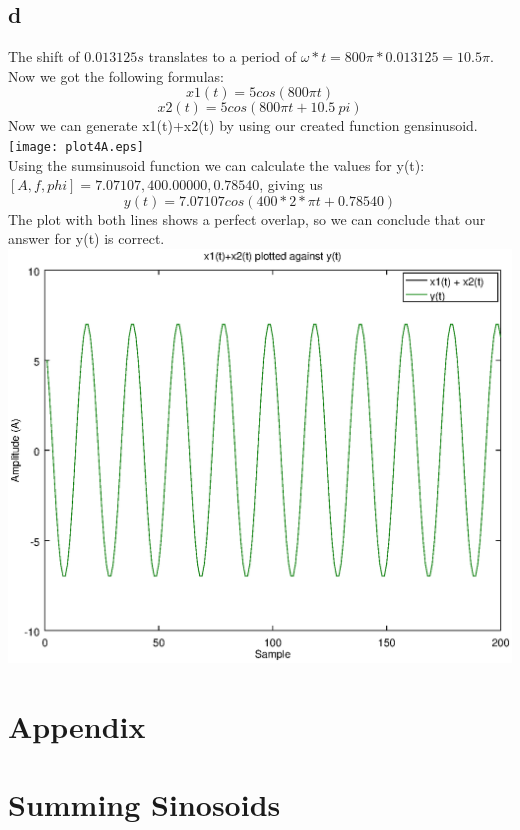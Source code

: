 \documentclass[10pt]{article}
\begin{document}
\subsection{d}
The shift of $0.013125s$ translates to a period of $\omega * t = 800\pi*0.013125 = 10.5\pi$.
Now we got the following formulas:
\begin{equation}
    x1(t) = 5 cos(800\pi t)
\end{equation}
\begin{equation}
    x2(t) = 5 cos(800\pi t + 10.5\:pi)
\end{equation}
Now we can generate x1(t)+x2(t) by using our created function gensinusoid.\\
\texttt{[image: plot4A.eps]}\\
Using the sumsinusoid function we can calculate the values for y(t):
$[A, f, phi] = 7.07107,400.00000,0.78540$, giving us\
\begin{equation}
    y(t) = 7.07107 cos(400*2*\pi t + 0.78540)
\end{equation}
The plot with both lines shows a perfect overlap,
so we can conclude that our answer for y(t) is correct.
\includegraphics[width=\columnwidth]{plot4B.eps}



\newpage
\section*{Appendix}
\appendix
\section{Summing Sinosoids}
\end{document}
